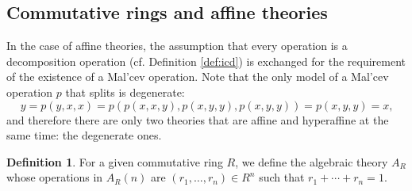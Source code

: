 \documentclass{amsart}
\numberwithin{equation}{section}
\theoremstyle{plain}
\theoremstyle{definition}
\newtheorem{definition}[theorem]{Definition}
\begin{document}
\subsection{Commutative rings and affine theories}
In the case of affine theories, 
the assumption that every operation is a decomposition operation (cf. Definition \ref{def:icd}) is exchanged for 
the requirement of the existence of a Mal'cev operation. 
Note that the only model of a Mal'cev operation $p$ that splits is degenerate: 
\begin{equation*}
  y=p(y,x,x)=p(p(x,x,y), p(x,y,y), p(x,y,y)) = p(x,y,y) = x \text{,}
\end{equation*}
and therefore there are only two theories that are affine and hyperaffine at the same time: the degenerate ones. 

\begin{definition}
  \label{def:ar}
  For a given commutative ring $R$, we define the algebraic theory $A_R$ whose operations in $A_R(n)$ are $(r_1, \ldots, r_n) \in R^n$ such that $r_1 + \cdots +r_n =1$. 
\end{definition}

\end{document}
